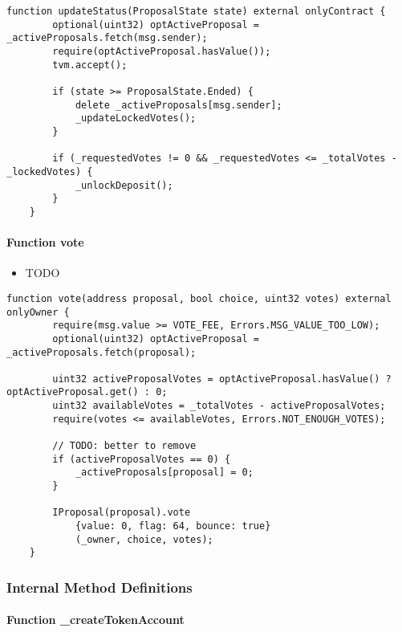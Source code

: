 \begin{lstlisting}[firstnumber=127]
    function updateStatus(ProposalState state) external onlyContract {
        optional(uint32) optActiveProposal = _activeProposals.fetch(msg.sender);
        require(optActiveProposal.hasValue());
        tvm.accept();

        if (state >= ProposalState.Ended) {
            delete _activeProposals[msg.sender];
            _updateLockedVotes();
        }

        if (_requestedVotes != 0 && _requestedVotes <= _totalVotes - _lockedVotes) {
            _unlockDeposit();
        }
    }
\end{lstlisting}

\paragraph{Function vote}

\begin{itemize}
\item TODO
\end{itemize}

\begin{lstlisting}[firstnumber=55]
    function vote(address proposal, bool choice, uint32 votes) external onlyOwner {
        require(msg.value >= VOTE_FEE, Errors.MSG_VALUE_TOO_LOW);
        optional(uint32) optActiveProposal = _activeProposals.fetch(proposal);

        uint32 activeProposalVotes = optActiveProposal.hasValue() ? optActiveProposal.get() : 0;
        uint32 availableVotes = _totalVotes - activeProposalVotes;
        require(votes <= availableVotes, Errors.NOT_ENOUGH_VOTES);

        // TODO: better to remove
        if (activeProposalVotes == 0) {
            _activeProposals[proposal] = 0;
        }
        
        IProposal(proposal).vote
            {value: 0, flag: 64, bounce: true}
            (_owner, choice, votes);
    }
\end{lstlisting}

\subsubsection{Internal Method Definitions}


\paragraph{Function \_{}createTokenAccount}


